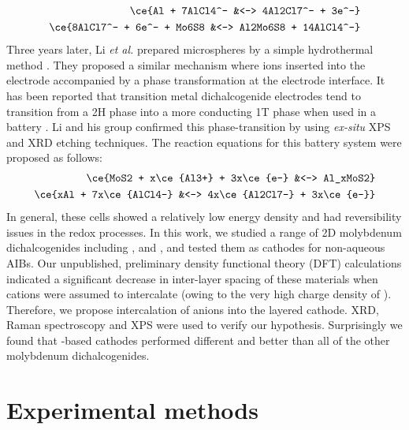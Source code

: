 \begin{align*}
          \ce{Al + 7AlCl4^- &<-> 4Al2Cl7^- + 3e^-}\\
\ce{8AlCl7^- + 6e^- + Mo6S8 &<-> Al2Mo6S8 + 14AlCl4^-}
\end{align*}
Three years later, Li \textit{et al.} prepared  microspheres by a simple hydrothermal method \cite{li_rechargeable_2018-1}. They proposed a similar mechanism where  ions inserted into the electrode accompanied by a phase transformation at the electrode interface. It has been reported that transition metal dichalcogenide electrodes tend to transition from a 2H phase into a more conducting 1T phase when used in a battery \cite{fan_hybrid_2017}. Li and his group confirmed this phase-transition by using \textit{ex-situ} XPS and XRD etching techniques. The reaction equations for this battery system were proposed as follows:
\begin{align*}
    \ce{MoS2 + x\ce{Al3+}  + 3x\ce{e-} &<-> Al_xMoS2}\\
    \ce{xAl + 7x\ce{AlCl4-} &<-> 4x\ce{Al2Cl7-} + 3x\ce{e-}}
\end{align*}
In general, these cells showed a relatively low energy density and had reversibility issues in the redox processes.
In this work, we studied a range of 2D molybdenum dichalcogenides including ,  and , and tested them as cathodes for non-aqueous AIBs. Our unpublished, preliminary density functional theory (DFT) calculations indicated a significant decrease in inter-layer spacing of these materials when  cations were assumed to intercalate (owing to the very high charge density of ). Therefore, we propose intercalation of  anions into the layered cathode. XRD, Raman spectroscopy and XPS were used to verify our hypothesis. Surprisingly we found that -based cathodes performed different and better than all of the other molybdenum dichalcogenides.
\section{Experimental methods}
